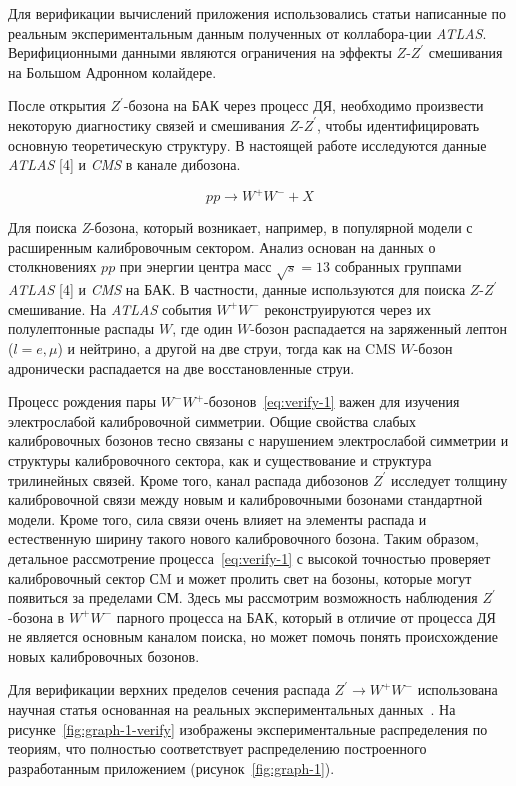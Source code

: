 Для верификации вычислений приложения использовались статьи написанные по реальным экспериментальным данным полученных от коллабора-ции \textit{ATLAS}. Верифиционными данными являются ограничения на эффекты $Z$-${Z}^{\prime}$ смешивания на Большом Адронном колайдере.

После открытия $Z^\prime$-бозона на БАК через процесс ДЯ, необходимо произвести некоторую диагностику связей и смешивания $Z$-$Z^\prime$, чтобы идентифицировать основную теоретическую структуру. В настоящей работе исследуются данные \textit{ATLAS} [4] и \textit{CMS} в канале дибозона.

\begin{equation} \label{eq:verify-1}
pp \rightarrow W^+W^- + X
\end{equation}

Для поиска \textit{Z}-бозона, который возникает, например, в популярной модели с расширенным калибровочным сектором. Анализ основан на данных о столкновениях $pp$ при энергии центра масс $\sqrt{s} = 13 $ собранных группами \textit{ATLAS} [4] и \textit{CMS} на БАК. В частности, данные используются для поиска $Z$-$Z^\prime$ смешивание. На \textit{ATLAS} события $W^+W^-$ реконструируются через их полулептонные распады $W$, где один $W$-бозон распадается на заряженный лептон ($l=e,\mu$) и нейтрино, а другой на две струи, тогда как на CMS $W$-бозон адронически распадается на две восстановленные струи. 

Процесс рождения пары $W^-W^+$-бозонов~\ref{eq:verify-1} важен для изучения электрослабой калибровочной симметрии. Общие свойства слабых калибровочных бозонов тесно связаны с нарушением электрослабой симметрии и структуры калибровочного сектора, как и существование и структура трилинейных связей. Кроме того, канал распада дибозонов $Z^\prime$ исследует толщину калибровочной связи между новым и калибровочными бозонами стандартной модели. Кроме того, сила связи очень влияет на элементы распада и естественную ширину такого нового калибровочного бозона. Таким образом, детальное рассмотрение процесса~\ref{eq:verify-1} с высокой точностью проверяет калибровочный сектор СM и может пролить свет на бозоны, которые могут появиться за пределами СМ. Здесь мы рассмотрим возможность наблюдения $Z^\prime$-бозона в $W^+W^-$ парного процесса на БАК, который в отличие от процесса ДЯ не является основным каналом поиска, но может помочь понять происхождение новых калибровочных бозонов.

Для верификации верхних пределов сечения распада ${Z}^{\prime} \rightarrow {W}^{+}{W}^{-} $ использована научная статья основанная на реальных экспериментальных данных~\cite{2part-pankov}. На рисунке~\ref{fig:graph-1-verify} изображены экспериментальные распределения по теориям, что полностью соответствует распределению построенного разработанным приложением (рисунок~\ref{fig:graph-1}).

